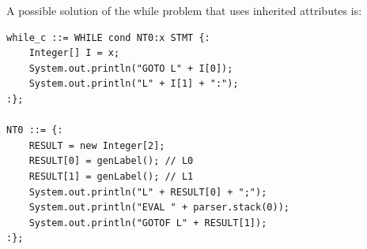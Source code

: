 A possible solution of the while problem that uses inherited attributes is:
\begin{lstlisting}
while_c ::= WHILE cond NT0:x STMT {:
    Integer[] I = x;
    System.out.println("GOTO L" + I[0]);
    System.out.println("L" + I[1] + ":");
:};

NT0 ::= {:
    RESULT = new Integer[2];
    RESULT[0] = genLabel(); // L0
    RESULT[1] = genLabel(); // L1
    System.out.println("L" + RESULT[0] + ";");
    System.out.println("EVAL " + parser.stack(0));
    System.out.println("GOTOF L" + RESULT[1]);
:};
\end{lstlisting}